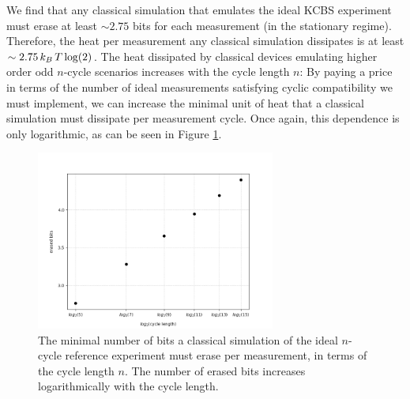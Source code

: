 We find that any classical simulation that emulates the ideal KCBS experiment must erase at least $\sim 2.75$ bits for each measurement (in the stationary regime).
Therefore, the heat per measurement any classical simulation dissipates is at least $\sim 2.75\thinspace k_B\thinspace T \log(2)$. The heat dissipated by classical devices emulating higher order odd $n$-cycle scenarios increases with the cycle length $n$: By paying a price in terms of the number of ideal measurements satisfying cyclic compatibility we must implement, we can increase the minimal unit of heat that a classical simulation must dissipate per measurement cycle. Once again, this dependence is only logarithmic, as can be seen in Figure \ref{fig:erasedbits}.

\begin{figure}
    \centering
    \includegraphics[width=0.7\textwidth]{images/erasedbits.png}
    \caption{The minimal number of bits a classical simulation of the ideal $n$-cycle reference experiment must erase per measurement, in terms of the cycle length $n$. The number of erased bits increases logarithmically with the cycle length.}
    \label{fig:erasedbits}
\end{figure}
